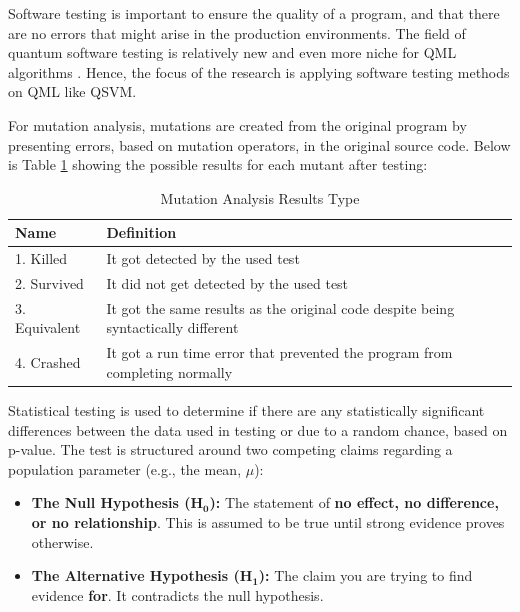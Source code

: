 \documentclass[12pt,a4paper]{article}
\begin{document}
	
	Software testing is important to ensure the quality of a program, and that there are no errors that might arise in the production environments. The field of quantum software testing is relatively new \cite{paltenghi2024surveytestinganalysisquantum} \cite{10.1145/3712002} and even more niche for QML algorithms \cite{zaman2025surveyquantummachinelearning} \cite{2021APS..MARS32013L}. Hence, the focus of the research is applying software testing methods on QML like QSVM. 
 
 For mutation analysis, mutations are created from the original program by presenting errors, based on mutation operators, in the original source code. Below is Table \ref{tab:mutation_analysis} showing the possible results for each mutant after testing:
	
	\begin{table}[h!]
		\centering
		\caption{Mutation Analysis Results Type}
		\label{tab:mutation_analysis}
		\begin{tabular}{|l|l|}
			\hline
			\textbf{Name} & \textbf{Definition} \\
			\hline
			1. Killed & It got detected by the used test \\
			2. Survived & It did not get detected by the used test\\
			3. Equivalent & It got the same results as the original code despite being syntactically different \\
			4. Crashed & It got a run time error that prevented the program from completing normally \\
			\hline
		\end{tabular}
	\end{table}
	
	Statistical testing is used to determine if there are any statistically significant differences between the data used in testing or due to a random chance, based on p-value. The test is structured around two competing claims regarding a population parameter (e.g., the mean, $\mu$):
	
	\begin{itemize}
		\item[$\bullet$] \textbf{The Null Hypothesis ($\mathbf{H_0}$):} The statement of \textbf{no effect, no difference, or no relationship}. This is assumed to be true until strong evidence proves otherwise.
		\item[$\bullet$] \textbf{The Alternative Hypothesis ($\mathbf{H_1}$):} The claim you are trying to find evidence \textbf{for}. It contradicts the null hypothesis.
	\end{itemize}
	
\end{document}
